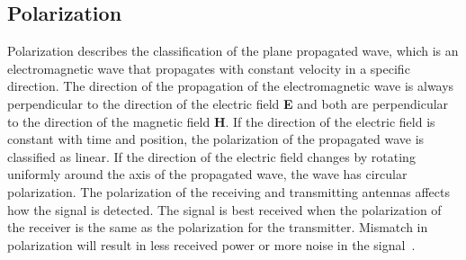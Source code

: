
\subsection{Polarization} \label{ss:polarization}
Polarization describes the classification of the plane propagated wave, which is an electromagnetic wave that propagates with constant velocity in a specific direction. The direction of the propagation of the electromagnetic wave is always perpendicular to the direction of the electric field \textbf{E} and both are perpendicular to the direction of the magnetic field \textbf{H}. If the direction of the electric field is constant with time and position, the polarization of the propagated wave is classified as linear. If the direction of the electric field changes by rotating uniformly around the axis of the propagated wave, the wave has circular polarization. The polarization of the receiving and transmitting antennas affects how the signal is detected. The signal is best received when the polarization of the receiver is the same as the polarization for the transmitter. Mismatch in polarization will result in less received power or more noise in the signal~\cite[p. 82-84]{direct_energy}. 

